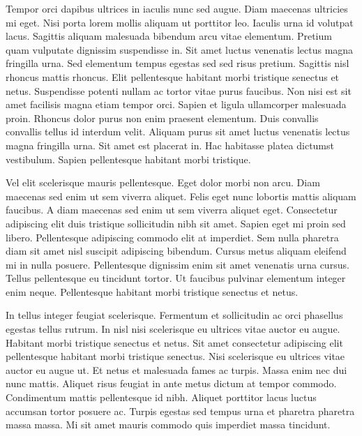 \documentclass[11pt,a4paper]{article}
\begin{document}
Tempor orci dapibus ultrices in iaculis nunc sed augue. Diam maecenas ultricies mi eget. Nisi porta lorem mollis aliquam ut porttitor leo. Iaculis urna id volutpat lacus. Sagittis aliquam malesuada bibendum arcu vitae elementum. Pretium quam vulputate dignissim suspendisse in. Sit amet luctus venenatis lectus magna fringilla urna. Sed elementum tempus egestas sed sed risus pretium. Sagittis nisl rhoncus mattis rhoncus. Elit pellentesque habitant morbi tristique senectus et netus. Suspendisse potenti nullam ac tortor vitae purus faucibus. Non nisi est sit amet facilisis magna etiam tempor orci. Sapien et ligula ullamcorper malesuada proin. Rhoncus dolor purus non enim praesent elementum. Duis convallis convallis tellus id interdum velit. Aliquam purus sit amet luctus venenatis lectus magna fringilla urna. Sit amet est placerat in. Hac habitasse platea dictumst vestibulum. Sapien pellentesque habitant morbi tristique.

Vel elit scelerisque mauris pellentesque. Eget dolor morbi non arcu. Diam maecenas sed enim ut sem viverra aliquet. Felis eget nunc lobortis mattis aliquam faucibus. A diam maecenas sed enim ut sem viverra aliquet eget. Consectetur adipiscing elit duis tristique sollicitudin nibh sit amet. Sapien eget mi proin sed libero. Pellentesque adipiscing commodo elit at imperdiet. Sem nulla pharetra diam sit amet nisl suscipit adipiscing bibendum. Cursus metus aliquam eleifend mi in nulla posuere. Pellentesque dignissim enim sit amet venenatis urna cursus. Tellus pellentesque eu tincidunt tortor. Ut faucibus pulvinar elementum integer enim neque. Pellentesque habitant morbi tristique senectus et netus.

In tellus integer feugiat scelerisque. Fermentum et sollicitudin ac orci phasellus egestas tellus rutrum. In nisl nisi scelerisque eu ultrices vitae auctor eu augue. Habitant morbi tristique senectus et netus. Sit amet consectetur adipiscing elit pellentesque habitant morbi tristique senectus. Nisi scelerisque eu ultrices vitae auctor eu augue ut. Et netus et malesuada fames ac turpis. Massa enim nec dui nunc mattis. Aliquet risus feugiat in ante metus dictum at tempor commodo. Condimentum mattis pellentesque id nibh. Aliquet porttitor lacus luctus accumsan tortor posuere ac. Turpis egestas sed tempus urna et pharetra pharetra massa massa. Mi sit amet mauris commodo quis imperdiet massa tincidunt.
\end{document}
